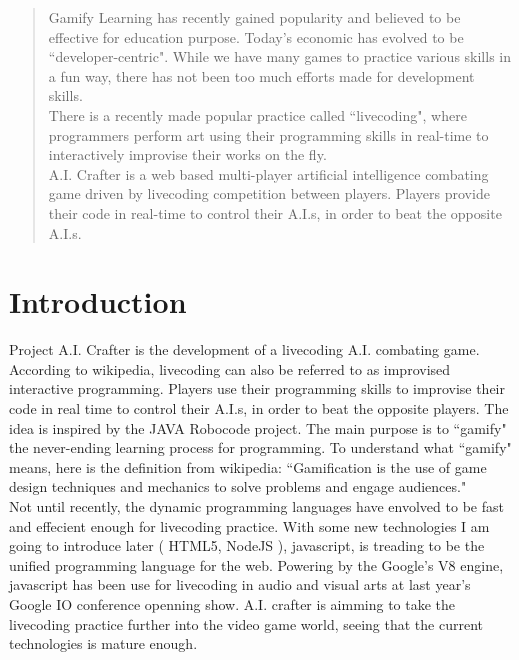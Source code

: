 \documentclass[12pt]{article}
\begin{document}
\maketitle

\begin{abstract}
Gamify Learning has recently gained popularity and believed to be effective for education purpose. Today’s economic has evolved to be ``developer-centric"\cite{venkatesh2011}. While we have many games to practice various skills in a fun way, there has not been too much efforts made for development skills.\\ 

There is a recently made popular practice called ``livecoding", where programmers perform art using their programming skills in real-time to interactively improvise their works on the fly.\\ 

A.I. Crafter is a web based multi-player artificial intelligence combating game driven by livecoding competition between players. Players provide their code in real-time to control their A.I.s, in order to beat the opposite A.I.s. 
\end{abstract}

\section{Introduction}
Project A.I. Crafter is the development of a livecoding A.I. combating game. According to wikipedia, livecoding can also be referred to as improvised interactive programming. Players use their programming skills to improvise their code in real time to control their A.I.s, in order to beat the opposite players. The idea is inspired by the JAVA Robocode\cite{robocode01} project. The main purpose is to ``gamify" the never-ending learning process for programming. To understand what ``gamify" means, here is the definition from wikipedia: ``Gamification is the use of game design techniques and mechanics to solve problems and engage audiences."\\

Not until recently, the dynamic programming languages have envolved to be fast and effecient enough for livecoding practice. With some new technologies I am going to introduce later ( HTML5, NodeJS ), javascript, is treading to be the unified programming language for the web. Powering by the Google's V8 engine, javascript has been use for livecoding in audio and visual arts at last year's Google IO conference openning show. A.I. crafter is aimming to take the livecoding practice further into the video game world, seeing that the current technologies is mature enough.\\
\end{document}
